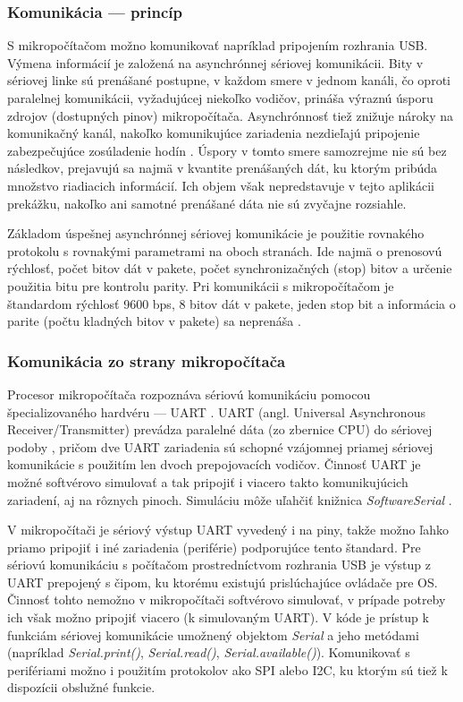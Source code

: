 \subsubsection{Komunikácia --- princíp}
S mikropočítačom možno komunikovať napríklad pripojením rozhrania USB. Výmena informácií je založená na asynchrónnej sériovej komunikácii. Bity v sériovej linke sú prenášané postupne, v každom smere v jednom kanáli, čo oproti paralelnej komunikácii, vyžadujúcej niekoľko vodičov, prináša výraznú úsporu zdrojov (dostupných pinov) mikropočítača. Asynchrónnosť tiež znižuje nároky na komunikačný kanál, nakoľko komunikujúce zariadenia nezdieľajú pripojenie zabezpečujúce zosúladenie hodín \cite{serialCommunication}. Úspory v tomto smere samozrejme nie sú bez následkov, prejavujú sa najmä v kvantite prenášaných dát, ku ktorým pribúda množstvo riadiacich informácií. Ich objem však nepredstavuje v tejto aplikácii prekážku, nakoľko ani samotné prenášané dáta nie sú zvyčajne rozsiahle.

Základom úspešnej asynchrónnej sériovej komunikácie je použitie rovnakého protokolu s rovnakými parametrami na oboch stranách. Ide najmä o prenosovú rýchlosť, počet bitov dát v pakete, počet synchronizačných (stop) bitov a určenie použitia bitu pre kontrolu parity. Pri komunikácii s mikropočítačom je štandardom rýchlosť 9600 bps, 8 bitov dát v pakete, jeden stop bit a informácia o parite (počtu kladných bitov v pakete) sa neprenáša \cite{serialCommunicationParameters}.

\subsubsection{Komunikácia zo strany mikropočítača}
Procesor mikropočítača rozpoznáva sériovú komunikáciu pomocou špecializovaného hardvéru --- UART \cite{sketchUpload}. UART (angl. Universal Asynchronous Receiver/Transmitter) prevádza paralelné dáta (zo zbernice CPU) do sériovej podoby \cite{uart}, pričom dve UART zariadenia sú schopné vzájomnej priamej sériovej komunikácie s použitím len dvoch prepojovacích vodičov. Činnosť UART je možné softvérovo simulovať a tak pripojiť i viacero takto komunikujúcich zariadení, aj na rôznych pinoch. Simuláciu môže uľahčiť knižnica \textit{SoftwareSerial} \cite{arduinoSoftwareSerial}.

V mikropočítači je sériový výstup UART vyvedený i na piny, takže možno ľahko priamo pripojiť i iné zariadenia (periférie) podporujúce tento štandard. Pre sériovú komunikáciu s počítačom prostredníctvom rozhrania USB je výstup z UART prepojený s  čipom, ku ktorému existujú prislúchajúce ovládače pre OS. Činnosť tohto  nemožno v mikropočítači softvérovo simulovať, v prípade potreby ich však možno pripojiť viacero (k simulovaným UART). V kóde je prístup k funkciám sériovej komunikácie umožnený objektom \textit{Serial} a jeho metódami (napríklad \textit{Serial.print()}, \textit{Serial.read()}, \textit{Serial.available()}). Komunikovať s perifériami možno i použitím protokolov ako SPI alebo I2C, ku ktorým sú tiež k dispozícii obslužné funkcie.

